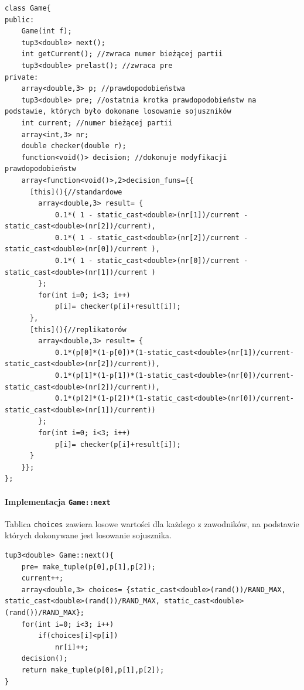 \begin{lstlisting}
class Game{
public:
    Game(int f);
    tup3<double> next();
    int getCurrent(); //zwraca numer bieżącej partii
    tup3<double> prelast(); //zwraca pre
private:
    array<double,3> p; //prawdopodobieństwa
    tup3<double> pre; //ostatnia krotka prawdopodobieństw na podstawie, których było dokonane losowanie sojuszników
    int current; //numer bieżącej partii
    array<int,3> nr;
    double checker(double r);
    function<void()> decision; //dokonuje modyfikacji prawdopodobieństw
    array<function<void()>,2>decision_funs={{
      [this](){//standardowe
        array<double,3> result= {
            0.1*( 1 - static_cast<double>(nr[1])/current - static_cast<double>(nr[2])/current),
            0.1*( 1 - static_cast<double>(nr[2])/current - static_cast<double>(nr[0])/current ),
            0.1*( 1 - static_cast<double>(nr[0])/current - static_cast<double>(nr[1])/current )
        };
        for(int i=0; i<3; i++)
            p[i]= checker(p[i]+result[i]);
      },
      [this](){//replikatorów
        array<double,3> result= {
            0.1*(p[0]*(1-p[0])*(1-static_cast<double>(nr[1])/current-static_cast<double>(nr[2])/current)),
            0.1*(p[1]*(1-p[1])*(1-static_cast<double>(nr[0])/current-static_cast<double>(nr[2])/current)),
            0.1*(p[2]*(1-p[2])*(1-static_cast<double>(nr[0])/current-static_cast<double>(nr[1])/current))
        };
        for(int i=0; i<3; i++)
            p[i]= checker(p[i]+result[i]);
      }
    }};
};
\end{lstlisting}

\paragraph{Implementacja \texttt{Game::next}}
Tablica \texttt{choices} zawiera losowe wartości dla każdego z zawodników, na podstawie których dokonywane jest losowanie sojusznika.
\begin{lstlisting}
tup3<double> Game::next(){
    pre= make_tuple(p[0],p[1],p[2]);
    current++;
    array<double,3> choices= {static_cast<double>(rand())/RAND_MAX, static_cast<double>(rand())/RAND_MAX, static_cast<double>(rand())/RAND_MAX};
    for(int i=0; i<3; i++)
        if(choices[i]<p[i])
            nr[i]++;
    decision();
    return make_tuple(p[0],p[1],p[2]);
}
\end{lstlisting}

